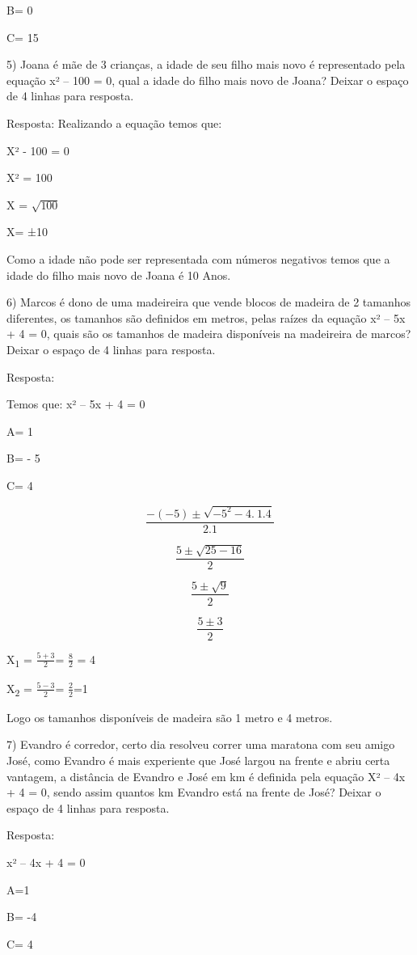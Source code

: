 {B= 0

C= 15

5) Joana é mãe de 3 crianças, a idade de seu filho mais novo é
representado pela equação x² -- 100 = 0, qual a idade do filho mais novo
de Joana? Deixar o espaço de 4 linhas para resposta.

Resposta: Realizando a equação temos que:

X² - 100 = 0

X² = 100

X = \(\sqrt{100}\)

X= ±10

Como a idade não pode ser representada com números negativos temos que a
idade do filho mais novo de Joana é 10 Anos.

6) Marcos é dono de uma madeireira que vende blocos de madeira de 2
tamanhos diferentes, os tamanhos são definidos em metros, pelas raízes
da equação x² -- 5x + 4 = 0, quais são os tamanhos de madeira
disponíveis na madeireira de marcos? Deixar o espaço de 4 linhas para
resposta.

Resposta:

Temos que: x² -- 5x + 4 = 0

A= 1

B= - 5

C= 4

\[\frac{- ( - 5) \pm \sqrt{{- 5}^{2} - 4.\ 1.4}}{2.1}\]

\[\frac{5 \pm \sqrt{25 - 16}}{2}\]

\[\frac{5 \pm \sqrt{9}}{2}\]

\[\frac{5 \pm 3}{2}\]

X\textsubscript{1} = \(\frac{5 + 3}{2}\)= \(\frac{8}{2}\) = 4

X\textsubscript{2} = \(\frac{5 - 3}{2}\)= \(\frac{2}{2}\)=1

Logo os tamanhos disponíveis de madeira são 1 metro e 4 metros.

7) Evandro é corredor, certo dia resolveu correr uma maratona com seu
amigo José, como Evandro é mais experiente que José largou na frente e
abriu certa vantagem, a distância de Evandro e José em km é definida
pela equação X² -- 4x + 4 = 0, sendo assim quantos km Evandro está na
frente de José? Deixar o espaço de 4 linhas para resposta.

Resposta:

x² -- 4x + 4 = 0

A=1

B= -4

C= 4

}

